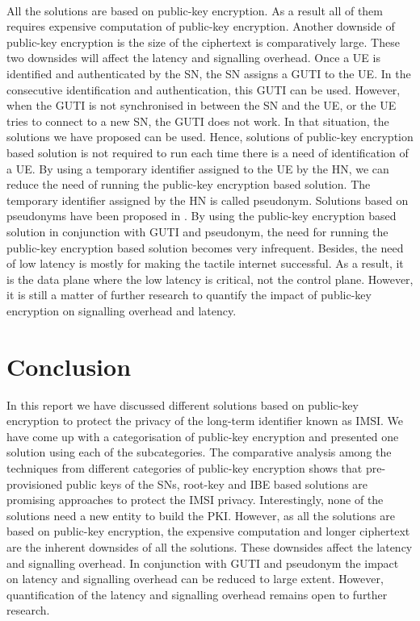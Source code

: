\documentclass[lnicst,sechang,a4paper]{svmultln}
\begin{document}
\paragraph{}
All the solutions are based on public-key encryption. As a result all of them requires expensive computation of public-key encryption. Another downside of public-key encryption is the size of the ciphertext is comparatively large. These two downsides will affect the latency and signalling overhead. Once a UE is identified and authenticated by the SN, the SN assigns a GUTI to the UE. In the consecutive identification and authentication, this GUTI can be used. However, when the GUTI is not synchronised in between the SN and the UE, or the UE tries to connect to a new SN, the GUTI does not work. In that situation, the solutions we have proposed can be used. Hence, solutions of public-key encryption based solution is not required to run each time there is a need of identification of a UE. By using a temporary identifier assigned to the UE by the HN, we can reduce the need of running the public-key encryption based solution. The temporary identifier assigned by the HN is called pseudonym. Solutions based on pseudonyms have been proposed in \cite{pseudonym_valtteri_philip,pseudonym_ericsson}. By using the public-key encryption based solution in conjunction with GUTI and pseudonym, the need for running the public-key encryption based solution becomes very infrequent. Besides, the need of low latency is mostly for making the tactile internet successful. As a result, it is the data plane where the low latency is critical, not the control plane. However, it is still a matter of further research to quantify the impact of public-key encryption on signalling overhead and latency. 



\section{Conclusion}
\label{sec:conclusion}
In this report we have discussed different solutions based on public-key encryption to protect the privacy of the long-term identifier known as IMSI. We have come up with a categorisation of public-key encryption and presented one solution using each of the subcategories. The comparative analysis among the techniques from different categories of public-key encryption shows that pre-provisioned public keys of the SNs, root-key and IBE based solutions are promising approaches to protect the IMSI privacy.
Interestingly, none of the solutions need a new entity to build the PKI. However, as all the solutions are based on public-key encryption, the expensive computation and longer ciphertext are the inherent downsides of all the solutions. These downsides affect the latency and signalling overhead. In conjunction with GUTI and pseudonym the impact on latency and signalling overhead can be reduced to large extent. However, quantification of the latency and signalling overhead remains open to further research.
\end{document}
